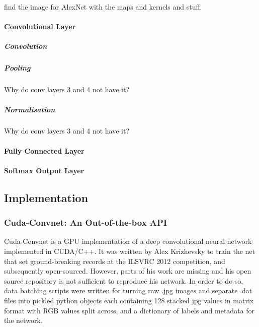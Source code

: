 \documentclass[a4paper,11pt]{article}
\begin{document}
find the image for AlexNet with the maps and kernels and stuff.

\paragraph{Convolutional Layer}

\subparagraph{Convolution}

\subparagraph{Pooling}

Why do conv layers 3 and 4 not have it? \\

\subparagraph{Normalisation}

Why do conv layers 3 and 4 not have it? \\

\paragraph{Fully Connected Layer}

\paragraph{Softmax Output Layer}


\subsection{Implementation}

\subsubsection{Cuda-Convnet: An Out-of-the-box API}

Cuda-Convnet is a GPU implementation of a deep convolutional neural network implemented in CUDA/C++. It was written by Alex Krizhevsky to train the net that set ground-breaking records at the ILSVRC 2012 competition, and subsequently open-sourced. However, parts of his work are missing and his open source repository is not sufficient to reproduce his network. In order to do so, data batching scripts were written for turning raw .jpg images and separate .dat files into pickled python objects each containing 128 stacked jpg values in matrix format with RGB values split across, and a dictionary of labels and metadata for the network. \\
\end{document}
